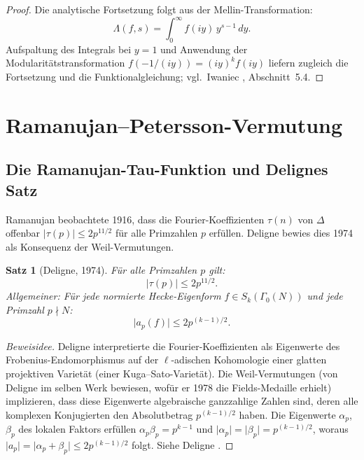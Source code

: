 \documentclass[12pt,a4paper]{amsart}
\newtheorem{theorem}{Satz}[section]
\theoremstyle{definition}
\begin{document}
\begin{proof}
  Die analytische Fortsetzung folgt aus der Mellin-Transformation:
  \[
    \Lambda(f,s) = \int_0^{\infty} f(iy)\, y^{s-1}\,dy.
  \]
  Aufspaltung des Integrals bei $y=1$ und Anwendung der Modularit\"atstransformation
  $f(-1/(iy)) = (iy)^k f(iy)$ liefern zugleich die Fortsetzung und die
  Funktionalgleichung; vgl.\ Iwaniec \cite{Iwaniec}, Abschnitt~5.4.
\end{proof}

\section{Ramanujan--Petersson-Vermutung}\label{sec:ramanujan}

\subsection{Die Ramanujan-Tau-Funktion und Delignes Satz}

Ramanujan beobachtete 1916, dass die Fourier-Koeffizienten $\tau(n)$ von
$\Delta$ offenbar $\lvert\tau(p)\rvert \le 2p^{11/2}$ f\"ur alle Primzahlen $p$
erf\"ullen. Deligne bewies dies 1974 als Konsequenz der Weil-Vermutungen.

\begin{theorem}[Deligne, 1974]\label{thm:deligne}
  F\"ur alle Primzahlen $p$ gilt:
  \[
    \lvert \tau(p) \rvert \le 2p^{11/2}.
  \]
  Allgemeiner: F\"ur jede normierte Hecke-Eigenform $f \in S_k(\Gamma_0(N))$
  und jede Primzahl $p \nmid N$:
  \[
    \lvert a_p(f) \rvert \le 2p^{(k-1)/2}.
  \]
\end{theorem}

\begin{proof}[Beweisidee]
  Deligne interpretierte die Fourier-Koeffizienten als Eigenwerte des
  Frobenius-Endomorphismus auf der $\ell$-adischen Kohomologie einer glatten
  projektiven Variet\"at (einer Kuga--Sato-Variet\"at). Die Weil-Vermutungen
  (von Deligne im selben Werk bewiesen, wof\"ur er 1978 die Fields-Medaille
  erhielt) implizieren, dass diese Eigenwerte algebraische ganzzahlige Zahlen
  sind, deren alle komplexen Konjugierten den Absolutbetrag $p^{(k-1)/2}$ haben.
  Die Eigenwerte $\alpha_p$, $\beta_p$ des lokalen Faktors erf\"ullen
  $\alpha_p\beta_p = p^{k-1}$ und $\lvert\alpha_p\rvert = \lvert\beta_p\rvert = p^{(k-1)/2}$,
  woraus $\lvert a_p\rvert = \lvert\alpha_p + \beta_p\rvert \le 2p^{(k-1)/2}$ folgt.
  Siehe Deligne \cite{Deligne74}.
\end{proof}
\end{document}
